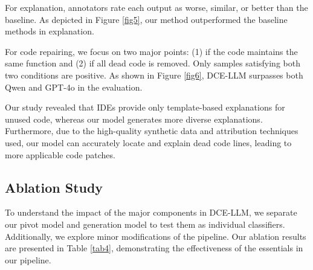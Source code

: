 \documentclass[11pt]{article}
\begin{document}

For explanation, annotators rate each output as worse, similar, or better than the baseline. As depicted in Figure \ref{fig5}, our method outperformed the baseline methods in explanation.

For code repairing, we focus on two major points: (1) if the code maintains the same function and (2) if all dead code is removed. Only samples satisfying both two conditions are positive. As shown in Figure \ref{fig6}, DCE-LLM surpasses both Qwen and GPT-4o in the evaluation.

Our study revealed that IDEs provide only template-based explanations for unused code, whereas our model generates more diverse explanations. Furthermore, due to the high-quality synthetic data and attribution techniques used, our model can accurately locate and explain dead code lines, leading to more applicable code patches.







\subsection{Ablation Study}
To understand the impact of the major components in DCE-LLM, we separate our pivot model and generation model to test them as individual classifiers. Additionally, we explore minor modifications of the pipeline. Our ablation results are presented in Table \ref{tab4}, demonstrating the effectiveness of the essentials in our pipeline.
\end{document}
